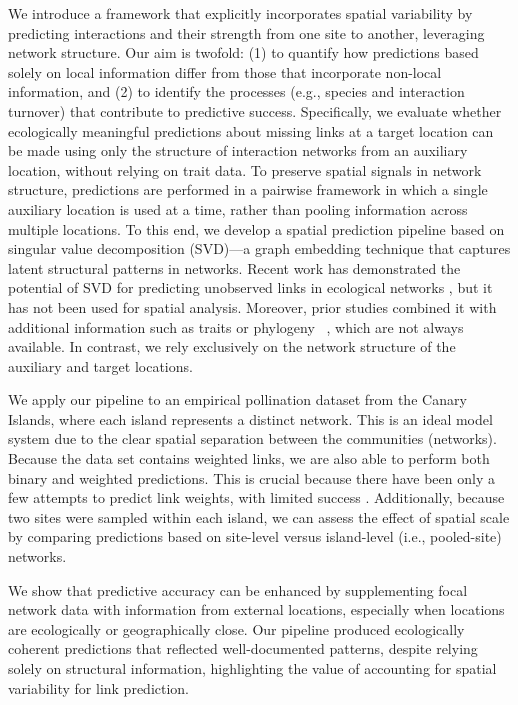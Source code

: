 \documentclass[oneside, a4paper, onecolumn, 11pt]{article}
\newcommand{\revtag}[1]{\textcolor{softcoral}{[#1]}}
\begin{document}
We introduce a framework that explicitly incorporates spatial variability by predicting interactions and their strength from one site to another, leveraging network structure. Our aim is twofold: (1) to quantify how predictions based solely on local information differ from those that incorporate non-local information, and (2) to identify the processes (e.g., species and interaction turnover) that contribute to predictive success. 
Specifically, we evaluate whether ecologically meaningful predictions about missing links at a target location can be made using only the structure of interaction networks from an auxiliary location, without relying on trait data. To preserve spatial signals in network structure, predictions are performed in a pairwise framework in which a single auxiliary location is used at a time, rather than pooling information across multiple locations.%
To this end, we develop a spatial prediction pipeline based on singular value decomposition (SVD)---a graph embedding technique that captures latent structural patterns in networks. Recent work has demonstrated the potential of SVD for predicting unobserved links in ecological networks \citep{Strydom2021-aq, Strydom2022-fe, Nunes-Martinez2024-uw}, but it has not been used for spatial analysis. Moreover, prior studies combined it with additional information such as traits or phylogeny ~\citep{Strydom2022-fe,Nunes-Martinez2024-uw}, which are not always available. In contrast, we rely exclusively on the network structure of the auxiliary and target locations.

We apply our pipeline to an empirical pollination dataset from the Canary Islands, where each island represents a distinct network. 
This is an ideal model system due to the clear spatial separation between the communities (networks). 
Because the data set contains weighted links, we are also able to perform both binary and weighted predictions. 
This is crucial because there have been only a few attempts to predict link weights, with limited success \citep{Terry2020-wv,Dormann2025-rz}. 
Additionally, because two sites were sampled within each island, we can assess the effect of spatial scale by comparing predictions based on site-level versus island-level (i.e., pooled-site) networks. 

We show that predictive accuracy can be enhanced by supplementing focal network data with information from external locations, especially when locations are ecologically or geographically close. Our pipeline produced ecologically coherent predictions that reflected well-documented patterns, despite relying solely on structural information, highlighting the value of accounting for spatial variability for link prediction.
\end{document}
